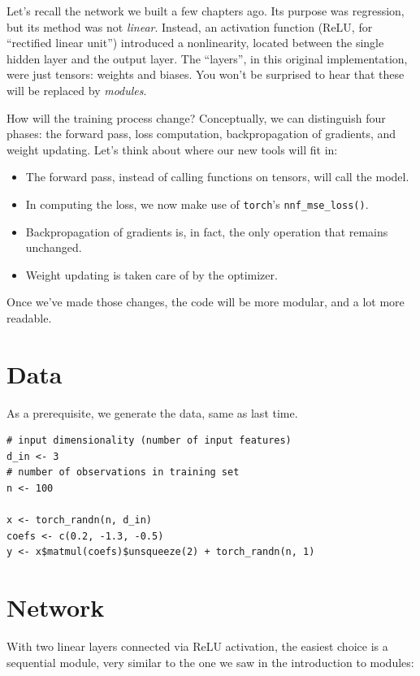 \documentclass[
  letterpaper,
]{krantz}
\begin{document}
Let's recall the network we built a few chapters ago. Its purpose was
regression, but its method was not \emph{linear}. Instead, an activation
function (ReLU, for ``rectified linear unit'') introduced a
nonlinearity, located between the single hidden layer and the output
layer. The ``layers'', in this original implementation, were just
tensors: weights and biases. You won't be surprised to hear that these
will be replaced by \emph{modules}.

How will the training process change? Conceptually, we can distinguish
four phases: the forward pass, loss computation, backpropagation of
gradients, and weight updating. Let's think about where our new tools
will fit in:

\begin{itemize}
\item
  The forward pass, instead of calling functions on tensors, will call
  the model.
\item
  In computing the loss, we now make use of \texttt{torch}'s
  \texttt{nnf\_mse\_loss()}.
\item
  Backpropagation of gradients is, in fact, the only operation that
  remains unchanged.
\item
  Weight updating is taken care of by the optimizer.
\end{itemize}

Once we've made those changes, the code will be more modular, and a lot
more readable.

\hypertarget{data}{%
\section{Data}\label{data}}

As a prerequisite, we generate the data, same as last time.

\begin{verbatim}
# input dimensionality (number of input features)
d_in <- 3
# number of observations in training set
n <- 100

x <- torch_randn(n, d_in)
coefs <- c(0.2, -1.3, -0.5)
y <- x$matmul(coefs)$unsqueeze(2) + torch_randn(n, 1)
\end{verbatim}

\hypertarget{network}{%
\section{Network}\label{network}}

With two linear layers connected via ReLU activation, the easiest choice
is a sequential module, very similar to the one we saw in the
introduction to modules:
\end{document}
